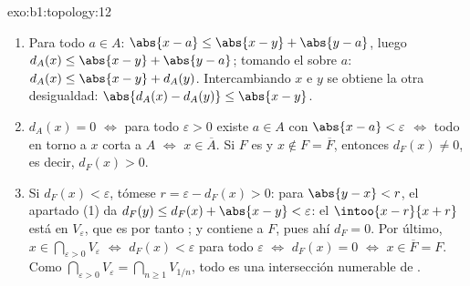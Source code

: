 \begin{solution}{exo:b1:topology:12}
\begin{enumerate}
  \item Para todo $a \in A$: $\abs{x - a} \leq \abs{x - y} +
        \abs{y - a}$, luego $d_A(x) \leq \abs{x - y} + \abs{y - a}$;
        tomando el  sobre $a$: $d_A(x) \leq \abs{x - y} +
        d_A(y)$. Intercambiando $x$ e $y$ se obtiene la otra
        desigualdad: $\abs{d_A(x) - d_A(y)} \leq \abs{x - y}$.
  \item $d_A(x) = 0$ $\iff$ para todo $\varepsilon > 0$ existe
        $a \in A$ con $\abs{x - a} < \varepsilon$ $\iff$ todo
         en torno a $x$ corta a $A$ $\iff$
        $x \in \overline A$. Si $F$ es  y
        $x \notin F = \overline F$, entonces $d_F(x) \neq 0$, es
        decir, $d_F(x) > 0$.
  \item Si $d_F(x) < \varepsilon$, tómese $r = \varepsilon -
        d_F(x) > 0$: para $\abs{y - x} < r$, el apartado (1) da
        $d_F(y) \leq d_F(x) + \abs{x - y} < \varepsilon$: el
         $\intoo{x - r}{x + r}$ está en $V_\varepsilon$,
        que es por tanto ; y contiene a $F$, pues ahí
        $d_F = 0$. Por último, $x \in \bigcap_{\varepsilon>0}
        V_\varepsilon$ $\iff$ $d_F(x) < \varepsilon$ para todo
        $\varepsilon$ $\iff$ $d_F(x) = 0$ $\iff$ $x \in \overline
        F = F$. Como $\bigcap_{\varepsilon > 0} V_\varepsilon =
        \bigcap_{n \geq 1} V_{1/n}$, todo  es una
        intersección numerable de .
\end{enumerate}
\end{solution}

